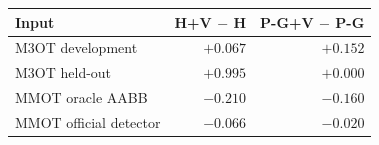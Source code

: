 \begin{tabular}{lrr}
\toprule
Input & H+V $-$ H & P-G+V $-$ P-G \\
\midrule
M3OT development & $+0.067$ & $+0.152$ \\
M3OT held-out & $+0.995$ & $+0.000$ \\
MMOT oracle AABB & $-0.210$ & $-0.160$ \\
MMOT official detector & $-0.066$ & $-0.020$ \\
\bottomrule
\end{tabular}
